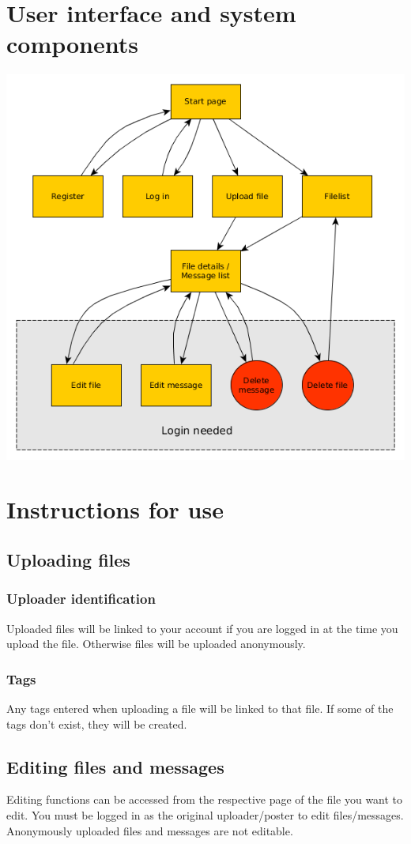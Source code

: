 \documentclass[10pt,a4paper]{article}
\begin{document}
\section{User interface and system components}
\includegraphics[scale=0.7]{diagrams/pageflow.png}

\section{Instructions for use}
\subsection{Uploading files}
\subsubsection{Uploader identification}
Uploaded files will be linked to your account if you are logged in at the time you upload the file. Otherwise files will be uploaded anonymously.
\subsubsection{Tags}
Any tags entered when uploading a file will be linked to that file. If some of the tags don't exist, they will be created.

\subsection{Editing files and messages}
Editing functions can be accessed from the respective page of the file you want to edit. You must be logged in as the original uploader/poster to edit files/messages. Anonymously uploaded files and messages are not editable.
\end{document}
